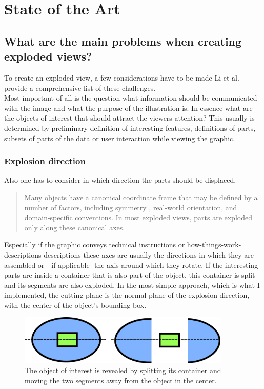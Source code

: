 \chapter{State of the Art}
\section{What are the main problems when creating exploded views?}

To create an exploded view,  a few considerations have to be made Li et al.\cite{proc:Li:2008:AGI} provide a comprehensive list of these challenges.\\
Most important of all is the question what information should be communicated with the image and what the purpose of the illustration is. In essence what are the objects of interest that should attract the viewers attention? This usually is determined by preliminary definition of interesting features, definitions of parts, subsets of parts of the data or user interaction while viewing the graphic.
\subsection{Explosion direction}
Also one has to consider in which direction the parts should be displaced. 
\begin{quote}
Many objects have a canonical coordinate frame that may be defined by a number of factors, including symmetry , real-world orientation, and domain-specific conventions. In most exploded views, parts are exploded only along these canonical axes.\cite{proc:Li:2008:AGI}
\end{quote}
Especially if the graphic conveys technical instructions or how-things-work-descriptions descriptions these axes are usually the directions in which they are assembled \cite{Agra03} or - if applicable- the axis around which they rotate\cite{MitraYYLA13}.
If the interesting parts are inside a container that is also part of the object, this container is split and its segments are also exploded. In the most simple approach, which is what I implemented, the cutting plane is the normal plane of the explosion direction, with the center of the object's bounding box.
\begin{figure}[tb]
	\centering
	\includegraphics[width=0.9\textwidth]{chapters/figures/splitting}
	\caption{The object of interest is revealed by splitting its container and moving the two segments away from the object in the center.}
	\label{fig:splitting}
\end{figure}
